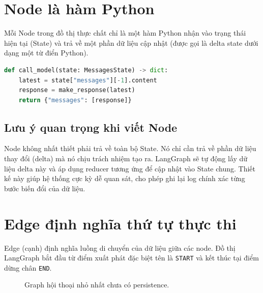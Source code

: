 \section{Node là hàm Python}

Mỗi Node trong đồ thị thực chất chỉ là một hàm Python nhận vào trạng thái hiện tại (State) và trả về một phần dữ liệu cập nhật (được gọi là delta state dưới dạng một từ điển Python).

\begin{lstlisting}[language=Python,caption={Hợp đồng của một model node}]
def call_model(state: MessagesState) -> dict:
    latest = state["messages"][-1].content
    response = make_response(latest)
    return {"messages": [response]}
\end{lstlisting}

\subsection{Lưu ý quan trọng khi viết Node}
Node không nhất thiết phải trả về toàn bộ State. Nó chỉ cần trả về phần dữ liệu thay đổi (delta) mà nó chịu trách nhiệm tạo ra. LangGraph sẽ tự động lấy dữ liệu delta này và áp dụng reducer tương ứng để cập nhật vào State chung. Thiết kế này giúp hệ thống cực kỳ dễ quan sát, cho phép ghi lại log chính xác từng bước biến đổi của dữ liệu.

\section{Edge định nghĩa thứ tự thực thi}

Edge (cạnh) định nghĩa luồng di chuyển của dữ liệu giữa các node. Đồ thị LangGraph bắt đầu từ điểm xuất phát đặc biệt tên là \texttt{START} và kết thúc tại điểm dừng chân \texttt{END}.

\begin{figure}[H]
\centering
{}
\caption{Graph hội thoại nhỏ nhất chưa có persistence.}
\label{fig:minimal-graph}
\end{figure}

